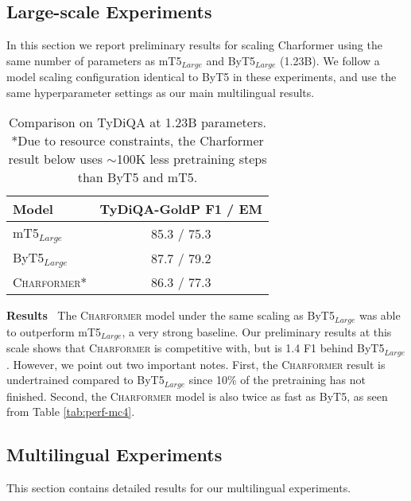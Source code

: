 \documentclass{article} \usepackage{iclr2022_conference,times}
\newcommand{\charformer}{\textsc{Charformer}\xspace}
\begin{document}
\subsection{Large-scale Experiments}

In this section we report preliminary results for scaling Charformer using the same number of parameters as mT5$_{Large}$ and ByT5$_{Large}$ (1.23B). We follow a model scaling configuration identical to ByT5 in these experiments, and use the same hyperparameter settings as our main multilingual results.
\begin{table}[H]
\small
    \centering
    \caption{Comparison on TyDiQA at 1.23B parameters. *Due to resource constraints, the Charformer result below uses $\sim$100K less pretraining steps than ByT5 and mT5.}
    \begin{tabular}{l c}
    \toprule
     Model & TyDiQA-GoldP F1 / EM\\
     \midrule
     mT5$_{Large}$ & 85.3 / 75.3 \\
     ByT5$_{Large}$ & 87.7 / 79.2 \\
     \textsc{Charformer}* & 86.3 / 77.3 \\
     \bottomrule
    \end{tabular}
    \label{tab:tydids}
\end{table}

\noindent \textbf{Results} $\:$ The \charformer model under the same scaling as ByT5$_{Large}$ was able to outperform mT5$_{Large}$, a very strong baseline. Our preliminary results at this scale shows that \charformer is competitive with, but is 1.4 F1 behind ByT5$_{Large}$. However, we point out two important notes. First, the \charformer result is undertrained compared to ByT5$_{Large}$ since 10\% of the pretraining has not finished. Second, the \charformer model is also twice as fast as ByT5, as seen from Table \ref{tab:perf-mc4}.

\subsection{Multilingual Experiments}
This section contains detailed results for our multilingual experiments.
\end{document}
